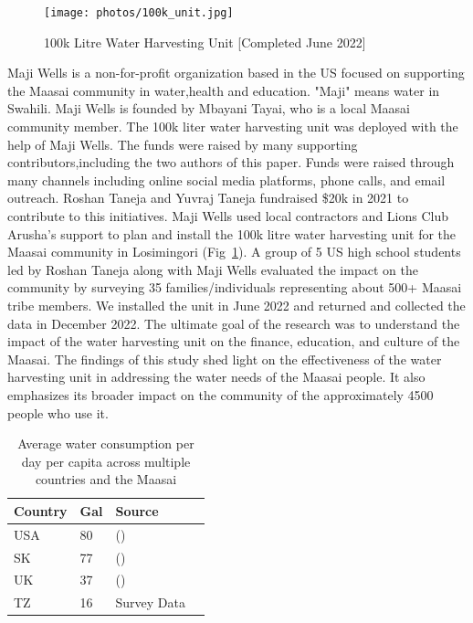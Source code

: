 \documentclass[10pt, twocolumn]{article}
\begin{document}
\begin{figure} [H]
    \centering
    \texttt{[image: photos/100k\_unit.jpg]}
    \caption{100k Litre Water Harvesting Unit [Completed June 2022]}
    \label{fig:100k_unit}
\end{figure}


Maji Wells is a non-for-profit organization based in the US focused on supporting the Maasai community in water,health and education. "Maji" means water in Swahili. Maji Wells is founded by Mbayani Tayai, who is a local Maasai community member. The 100k liter water harvesting unit was deployed with the help of Maji Wells. The funds were raised by many supporting contributors,including the two authors of this paper. Funds were raised through many channels including online social media platforms, phone calls, and email outreach. Roshan Taneja and Yuvraj Taneja fundraised \$20k in 2021 to contribute to this initiatives. Maji Wells used local contractors and Lions Club Arusha's support to plan and install the 100k litre water harvesting unit for the Maasai community in Losimingori  (Fig~\ref{fig:100k_unit}). A group of 5 US high school students led by Roshan Taneja along with Maji Wells evaluated the impact on the community by surveying 35 families/individuals representing about 500+ Maasai tribe members. We installed the unit in June 2022 and returned and collected the data in December 2022. The ultimate goal of the research was to understand the impact of the water harvesting unit on the finance, education, and culture of the Maasai.  The findings of this study shed light on the effectiveness of the water harvesting unit in addressing the water needs of the Maasai people. It also emphasizes its broader impact on the community of the approximately 4500 people who use it.

\begin{table} [H]
    \begin{tabular}{@{}llll@{}}
    \toprule
    Country & \multicolumn{1}{l}{Gal} & Source &  \\ \midrule
    USA & 80 & (\autocite{USA_Water}) &  \\
    SK & 77 & (\autocite{SK_Water}) &  \\
    UK & 37 & (\autocite{UK_Water}) &  \\
    TZ & 16& Survey Data & \\ \bottomrule
    \end{tabular}
    \caption{Average water consumption per day per capita across multiple countries and the Maasai}
    \label{tab:water_consumption}
\end{table}
\end{document}
